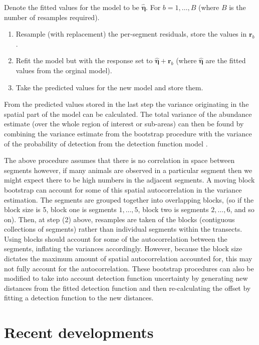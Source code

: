 \documentclass[a4paper,12pt]{article}
\begin{document}
Denote the fitted values for the model to be $\hat{\bm{\eta}}$. For $b=1,\ldots,B$ (where $B$ is the number of resamples required).
\begin{enumerate}
	\item Resample (with replacement) the per-segment residuals, store the values in $\mathbf{r}_{b}$.
	\item Refit the model but with the response set to $\hat{\bm{\eta}}+\mathbf{r}_{b}$ (where $\hat{\bm{\eta}}$ are the fitted values from the orginal model).
	\item Take the predicted values for the new model and store them.
\end{enumerate}
From the predicted values stored in the last step the variance originating in the spatial part of the model can be calculated. The total variance of the abundance estimate (over the whole region of interest or sub-areas) can then be found by combining the variance estimate from the bootstrap procedure with the variance of the probability of detection from the detection function model \citep[using the delta method which assumes that the two components of the variance are independent;][]{Seber:2002ti}.

The above procedure assumes that there is no correlation in space between segments however, if many animals are observed in a particular segment then we might expect there to be high numbers in the adjacent segments. A moving block bootstrap \citep[MBB;][Section 8.6]{Efron:1993tv} can account for some of this spatial autocorrelation in the variance estimation. The segments are grouped together into overlapping blocks, (so if the block size is 5, block one is segments $1,\ldots,5$, block two is segments $2,\ldots,6$, and so on). Then, at step (2) above, resamples are taken of the blocks (contiguous collections of segments) rather than individual segments within the transects. Using blocks should account for some of the autocorrelation between the segments, inflating the variances accordingly. However, because the block size dictates the maximum amount of spatial autocorrelation accounted for, this may not fully account for the autocorrelation. These bootstrap procedures can also be modified to take into account detection function uncertainty by generating new distances from the fitted detection function and then re-calculating the offset by fitting a detection function to the new distances.
 

\section*{Recent developments}
\label{s:recentadvances}
\end{document}
